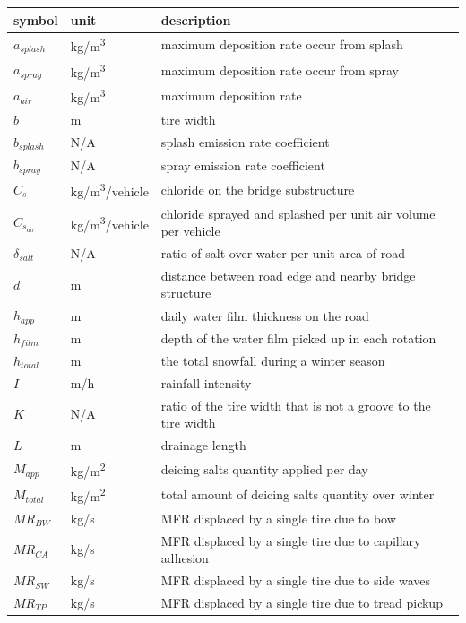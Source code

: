 \documentclass[12pt]{article}
\begin{document}
\renewcommand{\arraystretch}{1.2}
\noindent \begin{longtable*}{l l p{12cm}} \toprule
\textbf{symbol} & \textbf{unit} & \textbf{description}\\
\midrule 
$a_{splash}$ & \si{kg/m^3} & maximum deposition rate occur from splash\\
$a_{spray}$ & \si{kg/m^3} & maximum deposition rate occur from spray\\
$a_{air}$ & \si{kg/m^3} & maximum deposition rate\\
$b$ & \si{m} & tire width\\
$b_{splash}$ & N/A & splash emission rate coefficient\\
$b_{spray}$ & N/A & spray emission rate coefficient\\
$C_s$ & \si{kg/m^3/vehicle} & chloride on the bridge substructure\\
$C_{s_{air}}$ & \si{kg/m^3/vehicle} & chloride sprayed and splashed per unit air volume per vehicle\\
$\delta_{salt}$ & N/A & ratio of salt over water per unit area of road\\
$d$ & \si{m} & distance between road edge and nearby bridge structure\\
$h_{app}$ & \si{m} & daily water film thickness on the road\\
$h_{film}$ & \si{m} & depth of the water film picked up in each rotation\\
$h_{total}$ & \si{m} & the total snowfall during a winter season\\
$I$ & \si{m/h} & rainfall intensity\\
$K$ & N/A & ratio of the tire width that is not a groove to the tire width\\
$L$ & \si{m} & drainage length\\
$M_{app}$ & \si{kg/m^2} & deicing salts quantity applied per day\\
$M_{total}$ & \si{kg/m^2} & total amount of deicing salts quantity over winter\\
$\mathit{MR_{BW}}$ & \si{kg/s} & MFR displaced by a single tire due to bow\\
$\mathit{MR_{CA}}$ & \si{kg/s} & MFR displaced by a single tire due to capillary adhesion\\
$\mathit{MR_{SW}}$ & \si{kg/s} & MFR displaced by a single tire due to side waves\\
$\mathit{MR_{TP}}$ & \si{kg/s} & MFR displaced by a single tire due to tread pickup\\

\end{longtable*}
\end{document}
